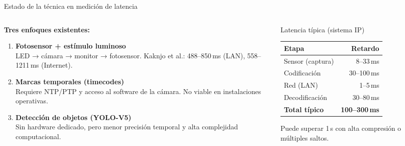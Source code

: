 \documentclass[aspectratio=169,11pt]{beamer}
\begin{document}
\begin{frame}{Estado de la técnica en medición de latencia}

\begin{columns}[T]
\begin{column}{0.55\textwidth}
\textbf{Tres enfoques existentes:}
\begin{enumerate}
    \item \textbf{Fotosensor + estímulo luminoso} \\
    {\small LED → cámara → monitor → fotosensor. Kaknjo et al.: 488--850\,ms (LAN), 558--1211\,ms (Internet).}
    \item \textbf{Marcas temporales (timecodes)} \\
    {\small Requiere NTP/PTP y acceso al software de la cámara. No viable en instalaciones operativas.}
    \item \textbf{Detección de objetos (YOLO-V5)} \\
    {\small Sin hardware dedicado, pero menor precisión temporal y alta complejidad computacional.}
\end{enumerate}
\end{column}
\begin{column}{0.4\textwidth}
\begin{block}{Latencia típica (sistema IP)}
\scriptsize
\begin{tabular}{lr}
\toprule
\textbf{Etapa} & \textbf{Retardo} \\
\midrule
Sensor (captura) & 8--33\,ms \\
Codificación & 30--100\,ms \\
Red (LAN) & 1--5\,ms \\
Decodificación & 30--80\,ms \\
\midrule
\textbf{Total típico} & \textbf{100--300\,ms} \\
\bottomrule
\end{tabular}
\end{block}
\vspace{0.2cm}
{\small Puede superar 1\,s con alta compresión o múltiples saltos.}
\end{column}
\end{columns}

\end{frame}
\end{document}
